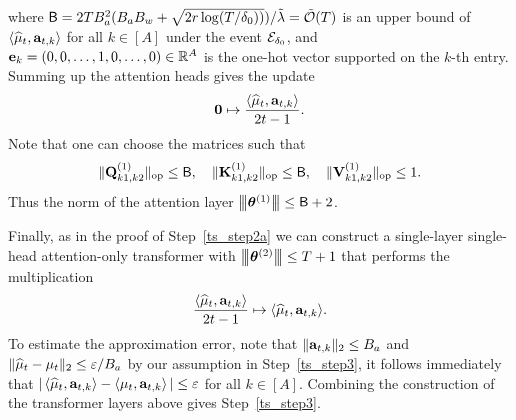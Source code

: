 where ${\mathsf{B}}=2TB_a^2(B_aB_w+\sqrt{2{r}\log(T/{\delta_0}))})/\tilde\lambda={\tilde{\mathcal O}}(T)$ is an upper bound of $\left\langle\widehat{{{\mathbf\mu}}}_t,{\mathbf a}_{t,k}\right\rangle$ for all $k\in[A]$ under the event ${\mathcal E}_{{\delta_0}}$, and ${\mathbf e}_k=(0,0,\ldots,1,0,\ldots,0)\in\mathbb{R}^{A}$ is the one-hot vector supported on the $k$-th entry. Summing up the attention heads gives the update 
$$
{\mathbf 0}\mapsto\frac{\left\langle\widehat{{{\mathbf\mu}}}_t,{\mathbf a}_{t,k}\right\rangle}{2t-1}.
$$ Note that one can choose the matrices such that 
$$\|{{\mathbf Q}^{(1)}_{k1,k2}}\|_{\mathrm{op}}\leq {\mathsf{B}},~~~\|{{\mathbf K}^{(1)}_{k1,k2}}\|_{\mathrm{op}}\leq {\mathsf{B}},~~~\|{{\mathbf V}^{(1)}_{k1,k2}}\|_{\mathrm{op}}\leq1.$$ Thus the norm of the attention layer  ${\left|\!\left|\!\left|{{\boldsymbol \theta}^{(1)}}\right|\!\right|\!\right|}\leq {\mathsf{B}}+2$.


Finally, as in the proof of Step~\ref{ts_step2a} we can construct a single-layer  single-head  attention-only transformer with ${\left|\!\left|\!\left|{{\boldsymbol \theta}^{(2)}}\right|\!\right|\!\right|}\leq T+1$ that performs the multiplication
$$
\frac{\left\langle\widehat{{{\mathbf\mu}}}_t,{\mathbf a}_{t,k}\right\rangle}{2t-1}\mapsto{\left\langle\widehat{{{\mathbf\mu}}}_t,{\mathbf a}_{t,k}\right\rangle}.
$$
 To estimate the approximation error, note that $\|{\mathbf a}_{t,k}\|_2\leq B_a$ and $\|\widehat{{{\mathbf\mu}}}_t-{{\mathbf\mu}}_t\|_2\leq\varepsilon/B_a$ by our assumption in Step~\ref{ts_step3}, it follows immediately that $|\left\langle\widehat{{{\mathbf\mu}}}_t,{\mathbf a}_{t,k}\right\rangle-\left\langle{{\mathbf\mu}}_t,{\mathbf a}_{t,k}\right\rangle|\leq\varepsilon$ for all $k\in[A]$. Combining the construction of the transformer layers above gives Step~\ref{ts_step3}.


